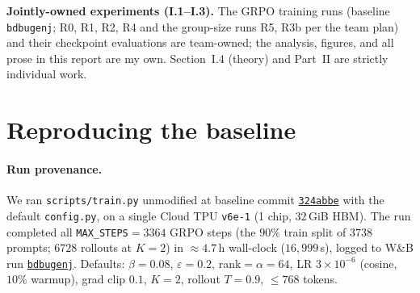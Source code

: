 \documentclass[11pt,a4paper]{article}
\begin{document}
\vspace{1.6cm}
\begin{center}
\begin{minipage}{0.86\textwidth}
  \small
  \textbf{Jointly-owned experiments (I.1--I.3).} The GRPO training runs (baseline
  \texttt{bdbugenj}; R0, R1, R2, R4 and the group-size runs R5, R3b per the team
  plan) and their checkpoint evaluations are team-owned; the analysis, figures, and
  all prose in this report are my own. Section~I.4 (theory) and Part~II are strictly
  individual work.
\end{minipage}
\end{center}

\clearpage
\setcounter{page}{1}  %


\section{Reproducing the baseline}
\label{sec:reproduce}

\paragraph{Run provenance.}
We ran \texttt{scripts/train.py} unmodified at baseline commit
\href{https://github.com/borisbolliet/tpu-2026/tree/324abbe4b4e229ea812223856393547db4fbb53e}{\texttt{324abbe}}
with the default \texttt{config.py}, on a single Cloud TPU \texttt{v6e-1} (1 chip,
$32$\,GiB HBM). The run completed all \texttt{MAX\_STEPS}$=3364$ GRPO steps (the
$90\%$ train split of $3738$ prompts; $6728$ rollouts at $K{=}2$) in
$\approx\!4.7$\,h wall-clock ($16{,}999$\,s), logged to W\&B run
\href{https://wandb.ai/sichengma0514-university-of-cambridge/a8-grpo/runs/bdbugenj}{\texttt{bdbugenj}}.
Defaults: $\beta{=}0.08$, $\varepsilon{=}0.2$, rank${=}\alpha{=}64$, LR
$3{\times}10^{-6}$ (cosine, $10\%$ warmup), grad clip $0.1$, $K{=}2$, rollout
$T{=}0.9$, $\le768$ tokens.
\end{document}
